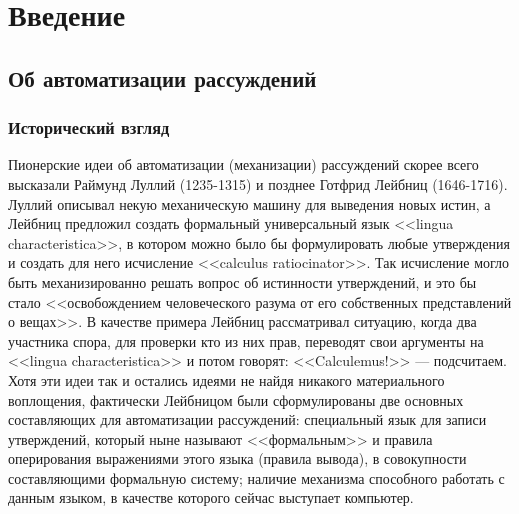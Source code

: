 \chapter{Введение}


\section{Об автоматизации рассуждений}
\subsection{Исторический взгляд}
Пионерские идеи об автоматизации (механизации) рассуждений скорее всего высказали Раймунд Луллий (1235-1315) и позднее Готфрид Лейбниц (1646-1716). Луллий описывал некую механическую машину для выведения новых истин, а Лейбниц предложил создать формальный универсальный язык <<lingua characteristica>>, в котором можно было бы формулировать любые утверждения и создать для него исчисление <<calculus ratiocinator>>. Так исчисление могло быть механизированно решать вопрос об истинности утверждений, и это бы стало <<освобождением человеческого разума от его собственных представлений о вещах>>. В качестве примера Лейбниц рассматривал ситуацию, когда два участника спора, для проверки кто из них прав, переводят свои аргументы на <<lingua characteristica>> и потом говорят: <<Calculemus!>> --- подсчитаем. Хотя эти идеи так и остались идеями не найдя никакого материального воплощения, фактически Лейбницом были сформулированы две основных составляющих для автоматизации рассуждений: специальный язык для записи утверждений, который ныне называют <<формальным>> и правила оперирования выражениями этого языка (правила вывода), в совокупности составляющими формальную систему; наличие механизма способного работать с данным языком, в качестве которого сейчас выступает компьютер.

